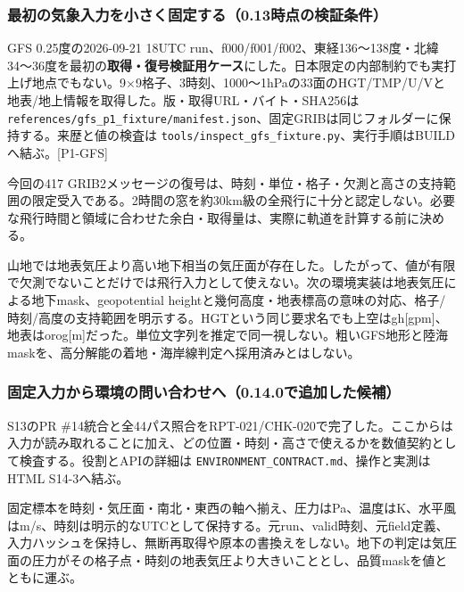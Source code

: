 \documentclass[11pt,a4paper]{article}
\begin{document}
\subsubsection{最初の気象入力を小さく固定する（0.13時点の検証条件）}\label{ux6700ux521dux306eux6c17ux8c61ux5165ux529bux3092ux5c0fux3055ux304fux56faux5b9aux3059ux308b0.13ux6642ux70b9ux306eux691cux8a3cux6761ux4ef6}

GFS 0.25度の2026-09-21 18UTC
run、f000/f001/f002、東経136〜138度・北緯34〜36度を最初の\textbf{取得・復号検証用ケース}にした。日本限定の内部制約でも実打上げ地点でもない。9×9格子、3時刻、1000〜1hPaの33面のHGT/TMP/U/Vと地表/地上情報を取得した。版・取得URL・バイト・SHA256は
\texttt{references/gfs\_p1\_fixture/manifest.json}、固定GRIBは同じフォルダーに保持する。来歴と値の検査は
\texttt{tools/inspect\_gfs\_fixture.py}、実行手順はBUILDへ結ぶ。{[}P1-GFS{]}

今回の417
GRIB2メッセージの復号は、時刻・単位・格子・欠測と高さの支持範囲の限定受入である。2時間の窓を約30km級の全飛行に十分と認定しない。必要な飛行時間と領域に合わせた余白・取得量は、実際に軌道を計算する前に決める。

山地では地表気圧より高い地下相当の気圧面が存在した。したがって、値が有限で欠測でないことだけでは飛行入力として使えない。次の環境実装は地表気圧による地下mask、geopotential
heightと幾何高度・地表標高の意味の対応、格子/時刻/高度の支持範囲を明示する。HGTという同じ要求名でも上空はgh{[}gpm{]}、地表はorog{[}m{]}だった。単位文字列を推定で同一視しない。粗いGFS地形と陸海maskを、高分解能の着地・海岸線判定へ採用済みとはしない。

\subsubsection{固定入力から環境の問い合わせへ（0.14.0で追加した候補）}\label{ux56faux5b9aux5165ux529bux304bux3089ux74b0ux5883ux306eux554fux3044ux5408ux308fux305bux30780.14.0ux3067ux8ffdux52a0ux3057ux305fux5019ux88dc}

S13のPR
\#14統合と全44パス照合をRPT-021/CHK-020で完了した。ここからは入力が読み取れることに加え、どの位置・時刻・高さで使えるかを数値契約として検査する。役割とAPIの詳細は
\texttt{ENVIRONMENT\_CONTRACT.md}、操作と実測はHTML S14-3へ結ぶ。

固定標本を時刻・気圧面・南北・東西の軸へ揃え、圧力はPa、温度はK、水平風はm/s、時刻は明示的なUTCとして保持する。元run、valid時刻、元field定義、入力ハッシュを保持し、無断再取得や原本の書換えをしない。地下の判定は気圧面の圧力がその格子点・時刻の地表気圧より大きいこととし、品質maskを値とともに運ぶ。
\end{document}
